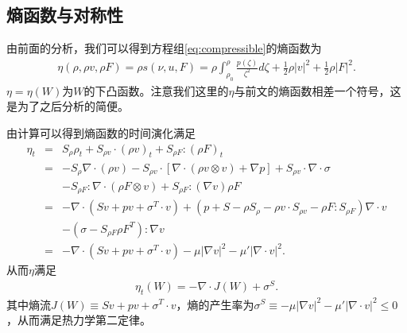 \subsection{熵函数与对称性}
由前面的分析，我们可以得到方程组\eqref{eq:compressible}的熵函数为
\begin{eqnarray}\label{22}
  \eta(\rho,\rho  v ,\rho F) = \rho s(\nu,u,F) =  \rho \int_{\rho_0}^\rho \frac{p(\zeta)}{\zeta^2} d\zeta + \frac{1}{2} \rho | v |^2 + \frac{1}{2} \rho |F|^2.
\end{eqnarray}
$\eta = \eta(W)$为$W$的下凸函数。注意我们这里的$\eta$与前文的熵函数相差一个符号，这是为了之后分析的简便。

由计算可以得到熵函数的时间演化满足
\begin{eqnarray}\label{eq:entropy}
  \eta_t  &=& S_\rho \rho_t + S_{\rho  v } \cdot (\rho  v )_t  + S_{\rho F} : (\rho F)_t \nonumber \\
  &=& -S_{\rho} \nabla \cdot (\rho  v )  - S_{\rho  v  } \cdot [\nabla \cdot (\rho  v \otimes v ) + \nabla p] + S_{\rho  v } \cdot \nabla \cdot \sigma \nonumber \\
    &&- S_{\rho F} : \nabla \cdot (\rho F\otimes  v  ) + S_{\rho F}:(\nabla   v ) \rho F \nonumber \\
    &=& - \nabla \cdot (S  v +p  v  +\sigma^T \cdot v ) + (p+S - \rho S_\rho - \rho  v  \cdot S_{\rho  v } - \rho F : S_{\rho F}) \nabla \cdot  v  \nonumber \\
    &&- (\sigma - S_{\rho F} \rho F^T) : \nabla  v \nonumber \\
    &=& - \nabla \cdot (S  v +p  v  +\sigma^T \cdot v ) - \mu|\nabla  v |^2 - \mu'|\nabla\cdot v |^2.
\end{eqnarray}
从而$\eta$满足
\begin{eqnarray}\label{eq:entropyvol}
  \eta_t(W) = -\nabla\cdot J(W) + \sigma^S.
\end{eqnarray}
其中熵流$J(W)\equiv S  v +p  v  +\sigma^T \cdot v $，熵的产生率为$\sigma^S \equiv - \mu|\nabla  v |^2 - \mu'|\nabla\cdot v |^2 \le 0$，从而满足热力学第二定律。

